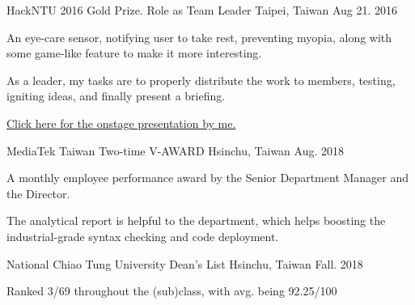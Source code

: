 

\begin{cventries}
\cventry
    {HackNTU 2016} %
    {Gold Prize. Role as Team Leader} %
    {Taipei, Taiwan} %
    {Aug 21. 2016} %
    {
      \begin{cvitems} %
        \item {An eye-care sensor, notifying user to take rest, preventing myopia, along with some game-like feature to make it more interesting.}
        \item {As a leader, my tasks are to properly distribute the work to members, testing, igniting ideas, and finally present a briefing.}
        \item {\href{https://www.youtube.com/watch?v=LerD1-Vispg}{Click here for the onstage presentation by me.}}
      \end{cvitems}
    } 

\cventry
    {MediaTek Taiwan} %
    {Two-time V-AWARD} %
    {Hsinchu, Taiwan} %
    {Aug. 2018} %
    {
      \begin{cvitems} %
        \item {A monthly employee performance award by the Senior Department Manager and the Director.}
        \item {The analytical report is helpful to the department, which helps boosting the industrial-grade syntax checking and code deployment.}
      \end{cvitems}
    }

\cventry
    {National Chiao Tung University} %
    {Dean's List} %
    {Hsinchu, Taiwan} %
    {Fall. 2018} %
    {
      \begin{cvitems} %
        \item {Ranked 3/69 throughout the (sub)class, with avg. being 92.25/100}
      \end{cvitems}
    }


\end{cventries}
